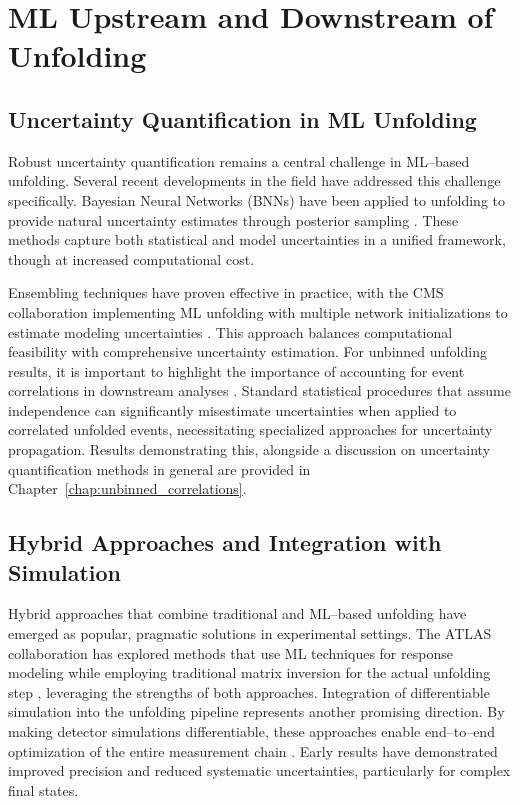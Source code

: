 \section{ML Upstream and Downstream of Unfolding}
\subsection{Uncertainty Quantification in ML Unfolding}

    Robust uncertainty quantification remains a central challenge in ML--based unfolding.
    Several recent developments in the field have addressed this challenge specifically.
    Bayesian Neural Networks (BNNs) have been applied to unfolding to provide natural uncertainty estimates through posterior sampling .
    These methods capture both statistical and model uncertainties in a unified framework, though at increased computational cost.

    Ensembling techniques have proven effective in practice, with the CMS collaboration implementing ML unfolding with multiple network initializations to estimate modeling uncertainties .
    This approach balances computational feasibility with comprehensive uncertainty estimation.
    For unbinned unfolding results, it is important to highlight the importance of accounting for event correlations in downstream analyses .
    Standard statistical procedures that assume independence can significantly misestimate uncertainties when applied to correlated unfolded events, necessitating specialized approaches for uncertainty propagation.
    Results demonstrating this, alongside a discussion on uncertainty quantification methods in general are provided in Chapter~\ref{chap:unbinned_correlations}.

\subsection{Hybrid Approaches and Integration with Simulation}

    Hybrid approaches that combine traditional and ML--based unfolding have emerged as popular, pragmatic solutions in experimental settings.
    The ATLAS collaboration has explored methods that use ML techniques for response modeling while employing traditional matrix inversion for the actual unfolding step , leveraging the strengths of both approaches.
    Integration of differentiable simulation into the unfolding pipeline represents another promising direction.
    By making detector simulations differentiable, these approaches enable end--to--end optimization of the entire measurement chain .
    Early results have demonstrated improved precision and reduced systematic uncertainties, particularly for complex final states.

